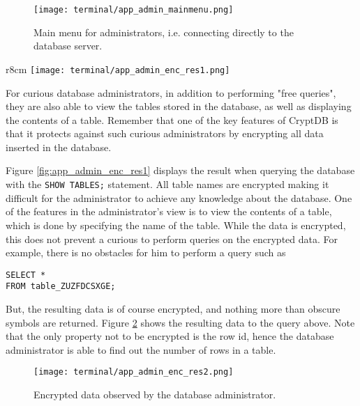 \begin{figure}
	\centering
	\texttt{[image: terminal/app\_admin\_mainmenu.png]}
	\caption{Main menu for administrators, i.e. connecting directly to the database server.}
	\label{fig:app_mm_admin}
\end{figure}


\newpage

\begin{wrapfigure}[13]{r}{8cm}
	\centering
    \texttt{[image: terminal/app\_admin\_enc\_res1.png]}
    \caption{Encrypted tables in CryptDB from a database administrator's perspective.}
    \label{fig:app_admin_enc_res1}
\end{wrapfigure}

For curious database administrators, in addition to performing "free queries", they are also able to view the tables stored in the database, as well as displaying the contents of a table. Remember that one of the key features of CryptDB is that it protects against such curious administrators by encrypting all data inserted in the database.

Figure \ref{fig:app_admin_enc_res1} displays the result when querying the database with the \verb!SHOW TABLES;! statement. All table names are encrypted making it difficult for the administrator to achieve any knowledge about the database. One of the features in the administrator's view is to view the contents of a table, which is done by specifying the name of the table. While the data is encrypted, this does not prevent a curious to perform queries on the encrypted data. For example, there is no obstacles for him to perform a query such as

\begin{verbatim}
SELECT *
FROM table_ZUZFDCSXGE;
\end{verbatim}

But, the resulting data is of course encrypted, and nothing more than obscure symbols are returned. Figure \ref{fig:admin_enc_res2} shows the resulting data to the query above. Note that the only property not to be encrypted is the row id, hence the database administrator is able to find out the number of rows in a table.

\begin{figure}[h]
	\centering
	\texttt{[image: terminal/app\_admin\_enc\_res2.png]}
	\caption{Encrypted data observed by the database administrator.}
	\label{fig:admin_enc_res2}
\end{figure}




